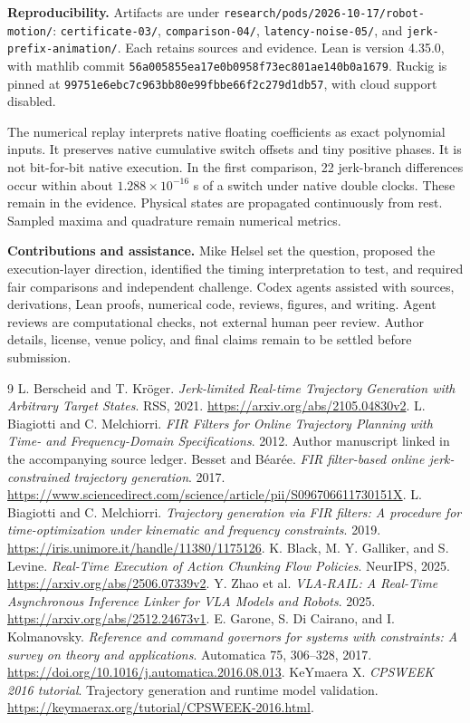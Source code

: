 \documentclass[11pt,letterpaper]{article}
\begin{document}
\textbf{Reproducibility.} Artifacts are under \texttt{research/pods/2026-10-17/robot-motion/}: \texttt{certificate-03/}, \texttt{comparison-04/}, \texttt{latency-noise-05/}, and \texttt{jerk-prefix-animation/}. Each retains sources and evidence. Lean is version 4.35.0, with mathlib commit \texttt{56a005855ea17e0b0958f73ec801ae140b0a1679}. Ruckig is pinned at \texttt{99751e6ebc7c963bb80e99fbbe66f2c279d1db57}, with cloud support disabled.

The numerical replay interprets native floating coefficients as exact polynomial inputs. It preserves native cumulative switch offsets and tiny positive phases. It is not bit-for-bit native execution. In the first comparison, 22 jerk-branch differences occur within about $1.288\times10^{-16}$ s of a switch under native double clocks. These remain in the evidence. Physical states are propagated continuously from rest. Sampled maxima and quadrature remain numerical metrics.

\textbf{Contributions and assistance.} Mike Helsel set the question, proposed the execution-layer direction, identified the timing interpretation to test, and required fair comparisons and independent challenge. Codex agents assisted with sources, derivations, Lean proofs, numerical code, reviews, figures, and writing. Agent reviews are computational checks, not external human peer review. Author details, license, venue policy, and final claims remain to be settled before submission.

\newpage
\begin{thebibliography}{9}\small
{} L. Berscheid and T. Kr\"oger.
\emph{Jerk-limited Real-time Trajectory Generation with Arbitrary Target States}.
RSS, 2021. \url{https://arxiv.org/abs/2105.04830v2}.
 L. Biagiotti and C. Melchiorri.
\emph{FIR Filters for Online Trajectory Planning with Time- and Frequency-Domain Specifications}. 2012. Author manuscript linked in the accompanying source ledger.
 Besset and B\'ear\'ee.
\emph{FIR filter-based online jerk-constrained trajectory generation}. 2017.
\url{https://www.sciencedirect.com/science/article/pii/S096706611730151X}.
 L. Biagiotti and C. Melchiorri.
\emph{Trajectory generation via FIR filters: A procedure for time-optimization under kinematic and frequency constraints}. 2019.
\url{https://iris.unimore.it/handle/11380/1175126}.
 K. Black, M. Y. Galliker, and S. Levine.
\emph{Real-Time Execution of Action Chunking Flow Policies}. NeurIPS, 2025.
\url{https://arxiv.org/abs/2506.07339v2}.
 Y. Zhao et al.
\emph{VLA-RAIL: A Real-Time Asynchronous Inference Linker for VLA Models and Robots}. 2025.
\url{https://arxiv.org/abs/2512.24673v1}.
 E. Garone, S. Di Cairano, and I. Kolmanovsky.
\emph{Reference and command governors for systems with constraints: A survey on theory and applications}.
Automatica 75, 306--328, 2017. \url{https://doi.org/10.1016/j.automatica.2016.08.013}.
 KeYmaera X.
\emph{CPSWEEK 2016 tutorial}. Trajectory generation and runtime model validation.
\url{https://keymaerax.org/tutorial/CPSWEEK-2016.html}.
\end{thebibliography}
\end{document}
